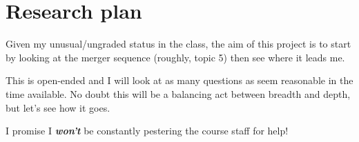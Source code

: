 

\setlength{\parskip}{0.5em}
\setlength{\skip\footins}{20pt}

\newcommand{\hmwkClass}{ASTR 400B}
\newcommand{\hmwkTitle}{Project Proposal}
\newcommand{\hmwkDueDate}{Feb 25, 2020}



	
\maketitle

\section*{Research plan}
Given my unusual/ungraded status in the class, the aim of this project is to start by looking at the merger sequence (roughly, topic 5) then see where it leads me.

This is open-ended and I will look at as many questions as seem reasonable in the time available. No doubt this will be a balancing act between breadth and depth, but let's see how it goes.

I promise I \textbf{\textit{won't}} be constantly pestering the course staff for help!


